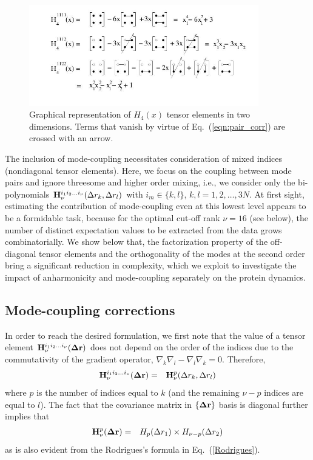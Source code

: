 \documentclass{article}
\begin{document}
\begin{figure}
\vspace*{2cm}
  \begin{center}
    \includegraphics[width=10cm]{./Fig1.jpg}
  \end{center}
\caption{Graphical representation of $H_4(x)$ tensor elements in two
dimensions. Terms that vanish by virtue of Eq.~(\ref{eqn:pair_corr})
are crossed with an arrow.}
\label{Fig1}
\end{figure}


The inclusion of mode-coupling necessitates consideration of mixed
indices (nondiagonal tensor elements). Here, we focus on the coupling
between mode pairs and ignore threesome and higher order mixing, i.e.,
we consider only the bi-polynomials ${\bf H}^{i_1i_2\dots
  i_\nu}_\nu(\Delta r_k,\Delta r_l)$ with $i_m \in \{k,l\}$,
$k,l=1,2,\dots,3N$. At first sight, estimating the contribution of
mode-coupling even at this lowest level appears to be a formidable
task, because for the optimal cut-off rank $\nu=16$ (see below), the
number of distinct expectation values to be extracted from the data
grows combinatorially. We show below that, the factorization property
of the off-diagonal tensor elements and the orthogonality of the modes
at the second order bring a significant reduction in complexity, which
we exploit to investigate the impact of anharmonicity and
mode-coupling separately on the protein dynamics.

\subsection{Mode-coupling corrections}
In order to reach the desired formulation, we first note that the value
of a tensor element ${\bf H}^{i_1i_2\dots i_\nu}_\nu({\bf \Delta r})$
does not depend on the order of the indices due to the commutativity
of the gradient operator, $\nabla_k\nabla_l -
\nabla_l\nabla_k=0$. Therefore,
\begin{eqnarray}
{\bf H}^{i_1i_2\dots i_\nu}_\nu({\bf \Delta r}) &=& {\bf H}^p_\nu(\Delta r_k,\Delta r_l) \nonumber
\end{eqnarray}
where $p$ is the number of indices equal to $k$ (and the remaining
$\nu-p$ indices are equal to $l$). The fact that the covariance matrix
in $\{{\bf \Delta r}\}$ basis is diagonal further implies that
\begin{eqnarray}
\label{factorization}
{\bf H}^p_\nu({\bf \Delta r}) &=& H_p(\Delta r_1)\times H_{\nu-p}(\Delta r_2)
\end{eqnarray}
as is also evident from the Rodrigues's formula in Eq.~(\ref{Rodrigues}).
\end{document}
